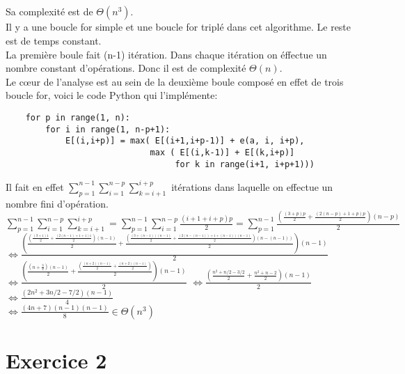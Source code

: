 \documentclass[french]{article}
\begin{document}
\subsection{}
Sa complexité est de $\Theta(n^3)$.\\
Il y a une boucle for simple et une boucle for triplé dans cet algorithme. Le reste est de temps constant.\\
La première boule fait (n-1) itération. Dans chaque itération on éffectue un nombre constant d'opérations. Donc il est de complexité $\Theta(n)$.\\
Le cœur de l'analyse est au sein de la deuxième boule composé en effet de trois boucle for, voici le code Python qui l'implémente:
\begin{lstlisting}
    for p in range(1, n):
        for i in range(1, n-p+1):
            E[(i,i+p)] = max( E[(i+1,i+p-1)] + e(a, i, i+p),
                             max ( E[(i,k-1)] + E[(k,i+p)]
                                  for k in range(i+1, i+p+1)))
\end{lstlisting}
Il fait en effet $\sum_{p=1}^{n-1}\sum_{i=1}^{n-p}\sum_{k=i+1}^{i+p}$ itérations dans laquelle on effectue un nombre fini d'opération.\\
$\sum_{p=1}^{n-1}\sum_{i=1}^{n-p}\sum_{k=i+1}^{i+p}=\sum_{p=1}^{n-1}\sum_{i=1}^{n-p}\frac{(i+1+i+p)p}{2}=\sum_{p=1}^{n-1}\frac{( \frac{(3+p)p}{2} + \frac{(2(n-p) + 1 + p)p}{2}) (n-p)}{2}$\\
$\Leftrightarrow \frac{
(\frac{( \frac{(3+1)1}{2} + \frac{(2(n-1) + 1 + 1)1}{2}) (n-1)}{2} + 
\frac{( \frac{(3+(n-1))(n-1)}{2} + \frac{(2(n-(n-1)) + 1 + (n-1))(n-1)}{2}) (n-(n-1))}{2})(n-1)}
{2}$\\
$\Leftrightarrow \frac{
(\frac{( n + \frac{3}{2}) (n-1)}{2} + 
\frac{( \frac{(n+2)(n-1)}{2} + \frac{(n+2)(n-1)}{2}) }{2})(n-1)}
{2}$
$\Leftrightarrow \frac{
(\frac{n^2 +  n/2 - 3/2}{2} + 
\frac{n^2 + n - 2}{2})(n-1)}
{2}$
$\Leftrightarrow \frac{
(2n^2 + 3n/2 - 7/2)(n-1)}
{4}$\\
$\Leftrightarrow \frac{
(4n+7)(n-1)(n-1)}
{8} \in \Theta(n^3) $

\section{Exercice 2}
\end{document}
